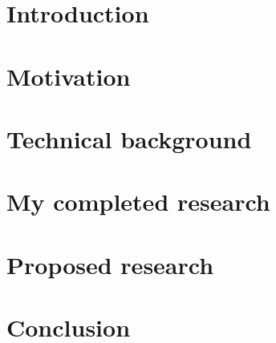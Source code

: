 
\section*{Introduction}




\section{Motivation}




\section{Technical background}






\section{My completed research}




\section{Proposed research}




\section*{Conclusion}






